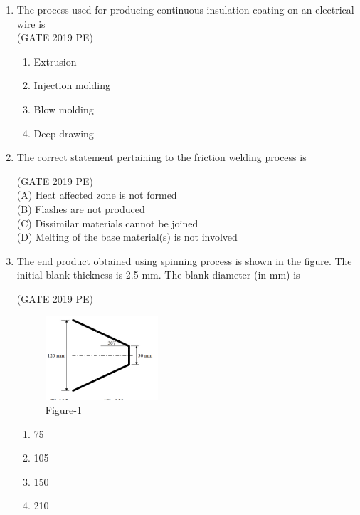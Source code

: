 \documentclass[journal,12pt,onecolumn]{exam}
\theoremstyle{remark}
\begin{document}
\begin{enumerate}
    \item The process used for producing continuous insulation coating on an electrical wire is\\

    \hfill{(GATE 2019 PE)}\\
    \begin{enumerate}
        \item Extrusion
        \item  Injection molding
        \item Blow molding
        \item Deep drawing
    \end{enumerate}
   

    \item The correct statement pertaining to the friction welding process is

     \hfill{(GATE 2019 PE)}\\
    (A) Heat affected zone is not formed\\
    (B) Flashes are not produced\\
    (C) Dissimilar materials cannot be joined\\
    (D) Melting of the base material(s) is not involved

    \item The end product obtained using spinning process is shown in the figure. The initial blank thickness is 2.5 mm. The blank diameter (in mm) is

     \hfill{(GATE 2019 PE)}\\
\begin{figure}[H]
    \centering
    \includegraphics[width=0.5\linewidth]{figs/fig1.png}
    \caption{Figure-1}
    \label{fig:figs/fig1.png}
\end{figure}
     \begin{enumerate}
         \item 75
         \item 105
         \item 150
         \item 210
     \end{enumerate}
   

\end{enumerate}
\end{document}
